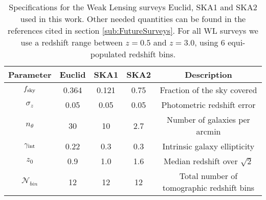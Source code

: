 \begin{table}[h]
\centering{}
\begin{tabular}{|c|ccc|c|}
\hline 
\Tstrut \textbf{Parameter}  & \textbf{Euclid}  & \textbf{SKA1}  & \textbf{SKA2}  &
\textbf{Description}\tabularnewline
\hline 
\Tstrut $f_{\rm sky}$  & 0.364  & 0.121  & 0.75 & Fraction of the sky covered\tabularnewline
$\sigma_{z}$  & 0.05  & 0.05  & 0.05  & Photometric redshift
error\tabularnewline
$n_{\theta}$  & 30  & 10  & 2.7  & Number of galaxies per arcmin\tabularnewline 
$\gamma_{\rm int}$  & 0.22  & 0.3  & 0.3  & Intrinsic galaxy ellipticity \tabularnewline
$z_{0}$  & 0.9  & 1.0  & 1.6  & Median redshift over $\sqrt{2}$ \tabularnewline
$\mathcal{N}_{bin}$ & 12 & 12 & 12 & Total number of tomographic redshift bins
\tabularnewline
\hline 
\end{tabular}\caption[Specifications for future WL surveys.]{\label{tab:WL-specifications} Specifications for
the Weak Lensing
surveys Euclid, SKA1 and SKA2 used in this work. Other needed quantities can be found in the references cited in section \ref{sub:FutureSurveys}.
For all WL surveys we use a redshift range between $z=0.5$ and $z=3.0$, using 6 equi-populated redshift bins.}
\end{table}

